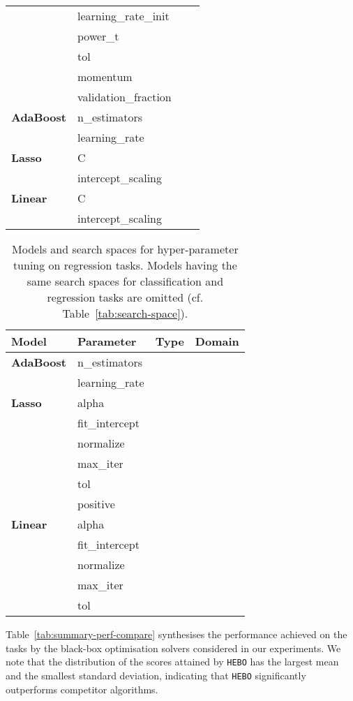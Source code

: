 \documentclass[jair,twoside,11pt,theapa]{article}
\theoremstyle{definition}
\begin{document}
\begin{table}[t!]
\begin{tabular}{llcl}
\ & learning\_rate\_init &  &  \\ 
\ & power\_t &  &  \\ 
\ & tol &  &  \\ 
\ & momentum &  &  \\ 
\ & validation\_fraction &  &  \\ 
\textbf{AdaBoost} &  n\_estimators &  &  \\ 
\ & learning\_rate &  &  \\ 
\textbf{Lasso} &  C &  &  \\ 
\ & intercept\_scaling &  &  \\ 
\textbf{Linear} &  C &  &  \\ 
\ & intercept\_scaling &  &  \\ 
\bottomrule
\end{tabular}
\end{table}


\begin{table}[t!]
\centering
    \caption{Models and search spaces for hyper-parameter tuning on regression tasks. Models having the same search spaces for classification and regression tasks are omitted (cf. Table~\ref{tab:search-space}).} 
\label{tab:search-space-reg}
\begin{tabular}{llcl}
\toprule
Model & Parameter  &  Type &  Domain \\
\midrule
\textbf{AdaBoost} &  n\_estimators &  &  \\ 
\ & learning\_rate &  &  \\ 
\textbf{Lasso} &  alpha &  &  \\ 
\ & fit\_intercept &  &  \\ 
\ & normalize &  &  \\ 
\ & max\_iter &  &  \\ 
\ & tol &  &  \\ 
\ & positive &  &  \\ 
\textbf{Linear} &  alpha &  &  \\ 
\ & fit\_intercept &  &  \\ 
\ & normalize &  &  \\ 
\ & max\_iter &  &  \\ 
\ & tol &  &  \\ 
\bottomrule
\end{tabular}
\end{table}

Table~\ref{tab:summary-perf-compare} synthesises the performance achieved on the  tasks by the black-box optimisation solvers considered in our experiments. We note that the distribution of the scores attained by \texttt{HEBO} has the largest mean and the smallest standard deviation, indicating that \texttt{HEBO} significantly outperforms competitor algorithms. 
\end{document}
